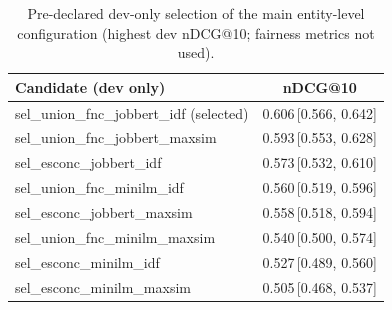\begin{table}[t]
\centering
\begin{tabular}{lc}
\toprule
Candidate (dev only) & nDCG@10 \\
\midrule
sel\_union\_fnc\_jobbert\_idf (selected) & 0.606\,{\scriptsize[0.566, 0.642]} \\
sel\_union\_fnc\_jobbert\_maxsim & 0.593\,{\scriptsize[0.553, 0.628]} \\
sel\_esconc\_jobbert\_idf & 0.573\,{\scriptsize[0.532, 0.610]} \\
sel\_union\_fnc\_minilm\_idf & 0.560\,{\scriptsize[0.519, 0.596]} \\
sel\_esconc\_jobbert\_maxsim & 0.558\,{\scriptsize[0.518, 0.594]} \\
sel\_union\_fnc\_minilm\_maxsim & 0.540\,{\scriptsize[0.500, 0.574]} \\
sel\_esconc\_minilm\_idf & 0.527\,{\scriptsize[0.489, 0.560]} \\
sel\_esconc\_minilm\_maxsim & 0.505\,{\scriptsize[0.468, 0.537]} \\
\bottomrule
\end{tabular}
\caption{Pre-declared dev-only selection of the main entity-level configuration (highest dev nDCG@10; fairness metrics not used).}
\label{tab:selection}
\end{table}
